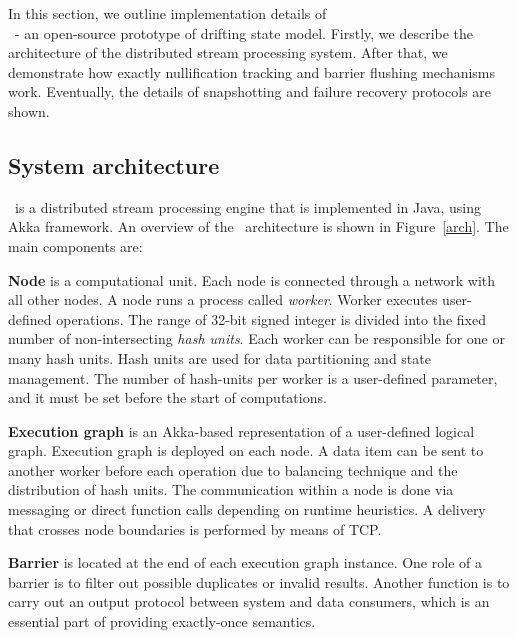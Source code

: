 
\label {fs-consistency-section}

In this section, we outline implementation details of \\ 
\FlameStream\ - an open-source prototype of drifting state model. Firstly, we describe the architecture of the distributed stream processing system. After that, we demonstrate how exactly nullification tracking and barrier flushing mechanisms work. Eventually, the details of snapshotting and failure recovery protocols are shown. 

\subsection{System architecture}


\FlameStream\ is a distributed stream processing engine that is implemented in Java, using Akka framework. An overview of the \FlameStream\ architecture is shown in Figure~\ref{arch}. The main components are:

{\bf Node} is a computational unit. Each node is connected through a network with all other nodes. A node runs a process called {\it worker}. Worker executes user-defined operations. The range of 32-bit signed integer is divided into the fixed number of non-intersecting {\it hash units}. Each worker can be responsible for one or many hash units. Hash units are used for data partitioning and state management. The number of hash-units per worker is a user-defined parameter, and it must be set before the start of computations. 

{\bf Execution graph} is an Akka-based representation of a user-defined logical graph. Execution graph is deployed on each node. A data item can be sent to another worker before each operation due to balancing technique and the distribution of hash units. The communication within a node is done via messaging or direct function calls depending on runtime heuristics. A delivery that crosses node boundaries is performed by means of TCP.

{\bf Barrier} is located at the end of each execution graph instance. One role of a barrier is to filter out possible duplicates or invalid results. Another function is to carry out an output protocol between system and data consumers, which is an essential part of providing exactly-once semantics.

